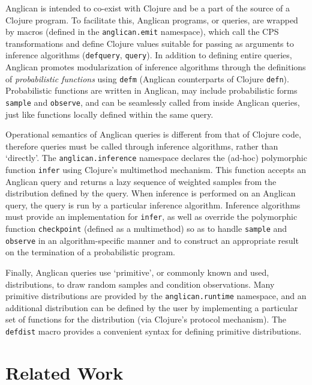 \documentclass[preprint]{sigplanconf}
\begin{document}
Anglican is intended to co-exist with Clojure and be a part of
the source of a Clojure program. To facilitate this, Anglican
programs, or queries, are wrapped by macros (defined in the
\texttt{anglican.emit} namespace), which call the CPS
transformations and define Clojure values
suitable for passing
as arguments to inference algorithms (\texttt{defquery},
\texttt{query}). In addition to defining entire queries,
Anglican promotes modularization of inference algorithms through
the definitions of \textit{probabilistic functions} using
\texttt{defm}
(Anglican counterparts of Clojure \texttt{defn}).
Probabilistic functions are
written in Anglican, may include probabilistic forms
\texttt{sample} and \texttt{observe}, and can be seamlessly
called from inside Anglican queries, just like functions locally
defined within the same query.

Operational semantics of Anglican queries is different from that
of Clojure code, therefore queries must be called through
inference algorithms, rather than `directly'.  The
\texttt{anglican.inference} namespace declares the (ad-hoc) polymorphic
function \texttt{infer} using Clojure's multimethod mechanism.
This function accepts an Anglican query and
returns a lazy sequence of weighted samples from the
distribution defined by the query.  When inference
is performed on an Anglican query, the query is run by a
particular inference algorithm. Inference algorithms must
provide an implementation for \texttt{infer}, as well as
override the polymorphic function \texttt{checkpoint} (defined
as a multimethod) so as to handle \texttt{sample} and
\texttt{observe} in an algorithm-specific manner and
to construct an appropriate result on the
termination of a probabilistic program.

Finally, Anglican queries use `primitive', or commonly known
and used, distributions, to draw random samples and condition
observations. Many primitive distributions are provided by the
\texttt{anglican.runtime} namespace, and an additional
distribution can be defined by the user by implementing a
particular set of functions for the distribution
(via Clojure's protocol mechanism). The \texttt{defdist} macro
provides a convenient syntax for defining primitive distributions.

\section{Related Work}
\label{sec:related}
\end{document}
